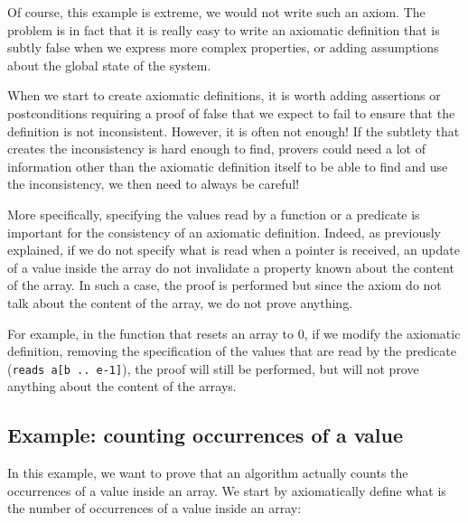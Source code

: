 \documentclass[12pt,francais,]{scrbook}
\begin{document}
Of course, this example is extreme, we would not write such an axiom.
The problem is in fact that it is really easy to write an axiomatic
definition that is subtly false when we express more complex properties,
or adding assumptions about the global state of the system.

When we start to create axiomatic definitions, it is worth adding
assertions or postconditions requiring a proof of false that we expect
to fail to ensure that the definition is not inconsistent. However, it
is often not enough! If the subtlety that creates the inconsistency is
hard enough to find, provers could need a lot of information other than
the axiomatic definition itself to be able to find and use the
inconsistency, we then need to always be careful!

More specifically, specifying the values read by a function or a
predicate is important for the consistency of an axiomatic definition.
Indeed, as previously explained, if we do not specify what is read when
a pointer is received, an update of a value inside the array do not
invalidate a property known about the content of the array. In such a
case, the proof is performed but since the axiom do not talk about the
content of the array, we do not prove anything.

For example, in the function that resets an array to 0, if we modify the
axiomatic definition, removing the specification of the values that are
read by the predicate (\texttt{reads\ a{[}b\ ..\ e-1{]}}), the proof
will still be performed, but will not prove anything about the content
of the arrays.

\subsection{Example: counting occurrences of a
value}\label{example-counting-occurrences-of-a-value}

In this example, we want to prove that an algorithm actually counts the
occurrences of a value inside an array. We start by axiomatically define
what is the number of occurrences of a value inside an array:
\end{document}
